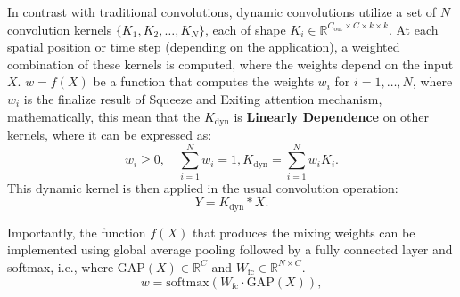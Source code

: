 In contrast with traditional convolutions, dynamic convolutions utilize a set of $N$ convolution kernels $\{K_1, K_2, \dots, K_N\}$, each of shape $K_i \in \mathbb{R}^{C_{\text{out}} \times C \times k \times k}$. At each spatial position or time step (depending on the application), a weighted combination of these kernels is computed, where the weights depend on the input $X$. $w = f(X)$ be a function that computes the weights $w_i$ for $i = 1, \dots, N$, where $w_i$ is the finalize result of Squeeze and Exiting attention mechanism, mathematically, this mean that the $K_{\text{dyn}}$ is \textbf{Linearly Dependence} on other kernels, where it can be expressed as:  
\[w_i \geq 0, \quad \sum_{i=1}^N w_i = 1, K_{\text{dyn}} = \sum_{i=1}^N w_i K_i.
\]
This dynamic kernel is then applied in the usual convolution operation:
\[
Y = K_{\text{dyn}} * X.
\]

Importantly, the function $f(X)$ that produces the mixing weights can be implemented using global average pooling followed by a fully connected layer and softmax, i.e., where $\text{GAP}(X) \in \mathbb{R}^C$ and $W_{\text{fc}} \in \mathbb{R}^{N \times C}$. \cite{chen2020dynamic}
\[
w = \text{softmax}(W_{\text{fc}} \cdot \text{GAP}(X)),
\]

